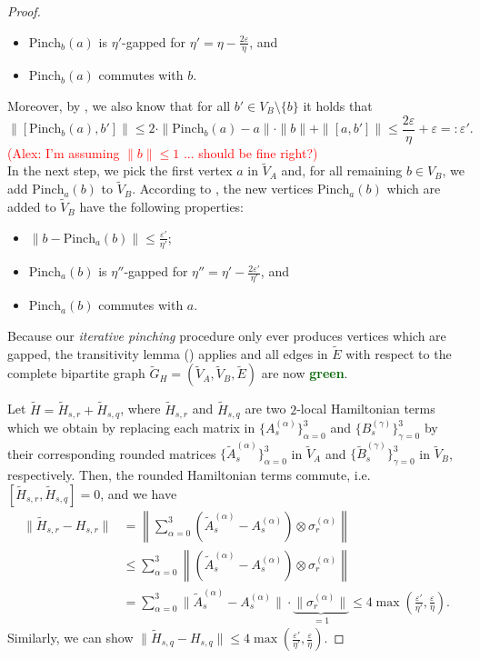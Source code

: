 \documentclass[11pt]{article}
\theoremstyle{plain}
\newcommand{\eps}{\varepsilon}
\newcommand{\AlexNote}[1]{\textcolor{red}{(Alex: #1)}}
\newcommand{\AlexNote}[1]{}
\begin{document}
\begin{proof}
\begin{itemize}
    \item  $\mathrm{Pinch}_b(a)$ is $\eta'$-gapped for $\eta ' = \eta - \frac{2\eps}{\eta}$, and
    \item $\mathrm{Pinch}_b(a)$ commutes with $b$.
\end{itemize}
Moreover, by , we also know that for all $b' \in V_B \setminus \{b\}$ it holds that
\begin{equation}
\|[\mathrm{Pinch}_b(a),b']\| \leq 2\cdot \| \mathrm{Pinch}_b(a) -a \| \cdot \|b\| + \|[a,b']\| \leq \frac{2\eps}{\eta} + \eps =: \eps'.
\end{equation}
\AlexNote{I'm assuming $\|b\| \leq 1$ ... should be fine right?}\ \\
In the next step, we pick the first vertex $a$ in $\tilde{V}_A$ and, for all remaining $b \in V_B$, we add $\mathrm{Pinch}_a(b)$ to $\tilde{V}_B$. According to , the new vertices $\mathrm{Pinch}_a(b)$ which are added to $\tilde{V}_B$ have the following properties:
\begin{itemize}
    \item $\|b - \mathrm{Pinch}_a(b) \| \leq \frac{\eps'}{\eta'}$;

    \item  $\mathrm{Pinch}_a(b)$ is $\eta''$-gapped for $\eta'' = \eta' - \frac{2\eps'}{\eta'}$, and
    \item $\mathrm{Pinch}_a(b)$ commutes with $a$.
\end{itemize}
Because our \emph{iterative pinching} procedure only ever produces vertices which are gapped, the transitivity lemma () applies and all edges in $\tilde{E}$ with respect to the complete bipartite graph $\tilde{G}_H = (\tilde{V}_A,\tilde{V}_B,\tilde{E})$ are now \textbf{\textcolor{DarkGreen}{green}}.

Let $\tilde H= \tilde H_{s, r}+ \tilde H_{s, q}$, where $\tilde H_{s, r}$ and $\tilde H_{s, q}$ are two $2$-local Hamiltonian terms which we obtain by replacing each matrix in $\{A_s^{(\alpha)}\}_{\alpha=0}^3$ and $\{B_s^{(\gamma)}\}_{\gamma=0}^3$ by their corresponding rounded matrices $\{\tilde A_s^{(\alpha)}\}_{\alpha=0}^3$ in $\tilde{V}_A$ and $\{\tilde B_s^{(\gamma)}\}_{\gamma=0}^3$ in $\tilde{V}_B$, respectively. Then, the rounded Hamiltonian terms commute, i.e. $[\tilde H_{s, r},\tilde H_{s, q}] = 0$, and we have
\begin{align}
\| \tilde H_{s, r}  - H_{s, r}\| &= \left\|\sum\limits_{\alpha = 0}^{3} (\tilde A_s^{(\alpha)} -  A_s^{(\alpha)})  \otimes \sigma_r^{(\alpha)} \right\|\\
&\leq \sum\limits_{\alpha = 0}^{3} \left\| (\tilde A_s^{(\alpha)} -  A_s^{(\alpha)})  \otimes \sigma_r^{(\alpha)} \right\|\\
&= \sum\limits_{\alpha = 0}^{3} \| \tilde A_s^{(\alpha)} -  A_s^{(\alpha)} \| \cdot \underbrace{\| \sigma_r^{(\alpha)}\|}_{=1} \leq 4 \max\left(\frac{\eps'}{\eta'},\frac{\eps}{\eta} \right).
\end{align}
Similarly, we can show $\| \tilde H_{s, q}  - H_{s, q}\| \leq 4 \max\left(\frac{\eps'}{\eta'},\frac{\eps}{\eta} \right)$.
\end{proof}
\end{document}
